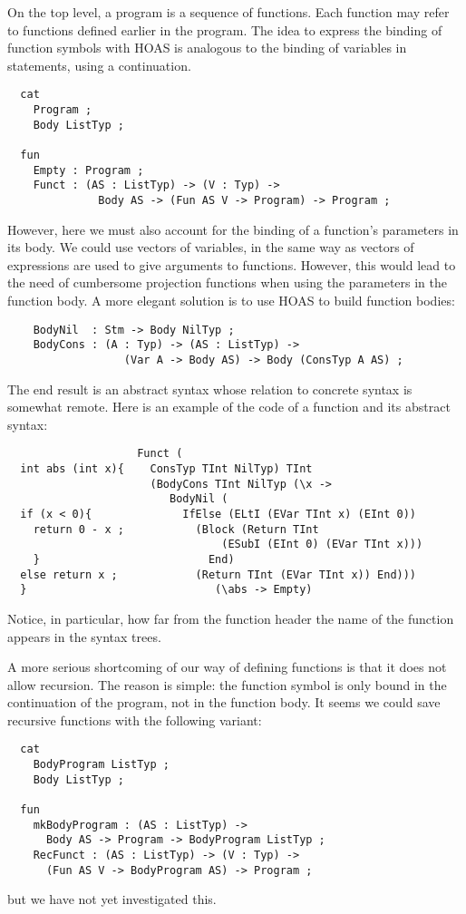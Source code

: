 \documentclass[12pt]{article}
\begin{document}
On the top level, a program is a sequence of functions.
Each function may refer to functions defined earlier
in the program. The idea to express the binding of
function symbols with HOAS is analogous to the binding
of variables in statements, using a continuation.
\begin{verbatim}
  cat
    Program ;
    Body ListTyp ;

  fun
    Empty : Program ;
    Funct : (AS : ListTyp) -> (V : Typ) -> 
              Body AS -> (Fun AS V -> Program) -> Program ;
\end{verbatim}
However, here we must also account for the binding of
a function's parameters in its body. We could use
vectors of variables, in the same way as vectors of
expressions are used to give arguments to functions.
However, this would lead to the need of cumbersome
projection functions when using the parameters
in the function body. A more elegant solution is
to use HOAS to build function bodies:
\begin{verbatim}
    BodyNil  : Stm -> Body NilTyp ;
    BodyCons : (A : Typ) -> (AS : ListTyp) -> 
                  (Var A -> Body AS) -> Body (ConsTyp A AS) ;
\end{verbatim}
The end result is an abstract syntax whose relation
to concrete syntax is somewhat remote. Here is an example of
the code of a function and its abstract syntax:
\begin{verbatim}
                    Funct (
  int abs (int x){    ConsTyp TInt NilTyp) TInt 
                      (BodyCons TInt NilTyp (\x -> 
                         BodyNil (
  if (x < 0){              IfElse (ELtI (EVar TInt x) (EInt 0))
    return 0 - x ;           (Block (Return TInt 
                                 (ESubI (EInt 0) (EVar TInt x))) 
    }                          End) 
  else return x ;            (Return TInt (EVar TInt x)) End))) 
  }                             (\abs -> Empty)
\end{verbatim}
Notice, in particular, how far from the function header the
name of the function appears in the syntax trees.

A more serious shortcoming of our way of defining functions 
is that it does not allow recursion. The reason is simple:
the function symbol is only bound in the continuation
of the program, not in the function body. It seems we could
save recursive functions with the following variant:
\begin{verbatim}
  cat
    BodyProgram ListTyp ;
    Body ListTyp ;

  fun
    mkBodyProgram : (AS : ListTyp) -> 
      Body AS -> Program -> BodyProgram ListTyp ;
    RecFunct : (AS : ListTyp) -> (V : Typ) -> 
      (Fun AS V -> BodyProgram AS) -> Program ;
\end{verbatim}
but we have not yet investigated this.
\end{document}
